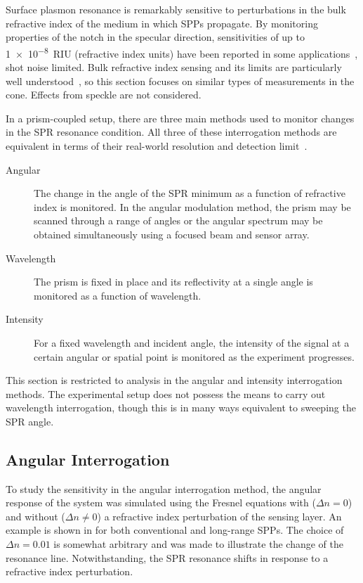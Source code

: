 Surface plasmon resonance is remarkably sensitive to perturbations in the bulk
refractive index of the medium in which SPPs propagate.  By monitoring
properties of the notch in the specular direction, sensitivities of up to
\SI{1e-8}{RIU} (refractive index units) have been reported in some
applications~\cite{fan2008sensitive}, shot noise limited.  Bulk refractive
index sensing and its limits are particularly well
understood~\cite{piliarik2009surface}, so this section focuses on similar types
of measurements in the cone.  Effects from speckle are not considered.

In a prism-coupled setup, there are three main methods used to monitor changes
in the SPR resonance condition.  All three of these interrogation methods are
equivalent in terms of their real-world resolution and detection
limit~\cite{homola2006surface}.
\begin{description}
\item [{Angular}] The change in the angle of the SPR minimum as a function
of refractive index is monitored.  In the angular modulation method,
the prism may be scanned through a range of angles or the angular
spectrum may be obtained simultaneously using a focused beam and
sensor array.
\item [{Wavelength}] The prism is fixed in place and its reflectivity at
a single angle is monitored as a function of wavelength.
\item [{Intensity}] For a fixed wavelength and incident angle, the
intensity of the signal at a certain angular or spatial point is
monitored as the experiment progresses.
\end{description}
This section is restricted to analysis in the angular and intensity
interrogation methods.  The experimental setup does not possess the means to
carry out wavelength interrogation, though this is in many ways equivalent to
sweeping the SPR angle.

\subsection{Angular Interrogation}
To study the sensitivity in the angular interrogation method, the angular
response of the system was simulated using the Fresnel equations with ($\Delta
n = 0$) and without ($\Delta n \ne 0$) a refractive index perturbation of the
sensing layer.  An example is shown in  for both
conventional and long-range SPPs.  The choice of $\Delta n = 0.01$ is somewhat
arbitrary and was made to illustrate the change of the resonance line.
Notwithstanding, the SPR resonance shifts in response to a refractive index
perturbation.

